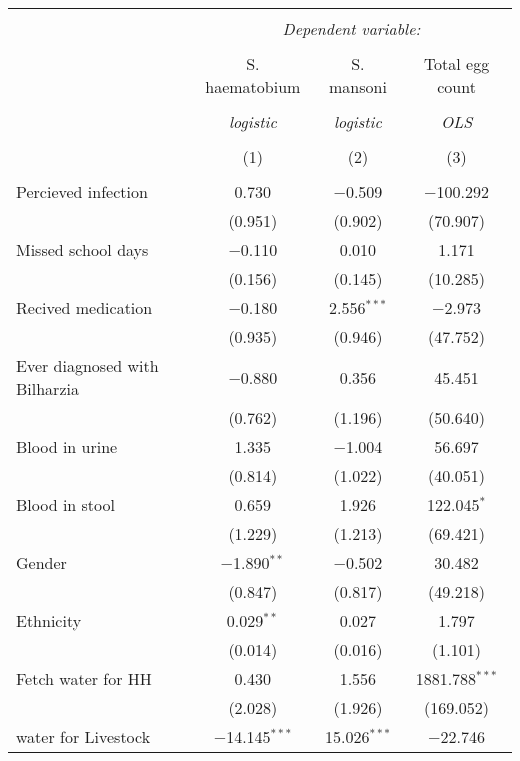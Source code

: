 
\begin{table}[!htbp] \centering 
  \caption{} 
  \label{} 
\begin{tabular}{@{\extracolsep{3pt}}lccc} 
\\[-1.8ex]\hline 
\hline \\[-1.8ex] 
 & \multicolumn{3}{c}{\textit{Dependent variable:}} \\ 
\cline{2-4} 
\\[-1.8ex] & S. haematobium & S. mansoni & Total egg count \\ 
\\[-1.8ex] & \textit{logistic} & \textit{logistic} & \textit{OLS} \\ 
\\[-1.8ex] & (1) & (2) & (3)\\ 
\hline \\[-1.8ex] 
 Percieved infection & 0.730 & $-$0.509 & $-$100.292 \\ 
  & (0.951) & (0.902) & (70.907) \\ 
  Missed school days & $-$0.110 & 0.010 & 1.171 \\ 
  & (0.156) & (0.145) & (10.285) \\ 
  Recived medication & $-$0.180 & 2.556$^{***}$ & $-$2.973 \\ 
  & (0.935) & (0.946) & (47.752) \\ 
  Ever diagnosed with Bilharzia & $-$0.880 & 0.356 & 45.451 \\ 
  & (0.762) & (1.196) & (50.640) \\ 
  Blood in urine & 1.335 & $-$1.004 & 56.697 \\ 
  & (0.814) & (1.022) & (40.051) \\ 
  Blood in stool & 0.659 & 1.926 & 122.045$^{*}$ \\ 
  & (1.229) & (1.213) & (69.421) \\ 
  Gender & $-$1.890$^{**}$ & $-$0.502 & 30.482 \\ 
  & (0.847) & (0.817) & (49.218) \\ 
  Ethnicity & 0.029$^{**}$ & 0.027 & 1.797 \\ 
  & (0.014) & (0.016) & (1.101) \\ 
  Fetch water for HH & 0.430 & 1.556 & 1881.788$^{***}$ \\ 
  & (2.028) & (1.926) & (169.052) \\ 
  water for Livestock & $-$14.145$^{***}$ & 15.026$^{***}$ & $-$22.746 \\ 

\end{tabular}
\end{table}

